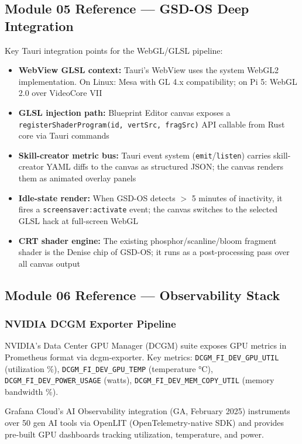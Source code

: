 \documentclass[11pt,letterpaper]{article}
\begin{document}
\subsection{Module 05 Reference --- GSD-OS Deep Integration}

Key Tauri integration points for the WebGL/GLSL pipeline:

\begin{itemize}[noitemsep]
  \item \textbf{WebView GLSL context:} Tauri's WebView uses the system WebGL2 implementation. On Linux: Mesa with GL 4.x compatibility; on Pi 5: WebGL 2.0 over VideoCore VII
  \item \textbf{GLSL injection path:} Blueprint Editor canvas exposes a \texttt{registerShaderProgram(id, vertSrc, fragSrc)} API callable from Rust core via Tauri commands
  \item \textbf{Skill-creator metric bus:} Tauri event system (\texttt{emit}/\texttt{listen}) carries skill-creator YAML diffs to the canvas as structured JSON; the canvas renders them as animated overlay panels
  \item \textbf{Idle-state render:} When GSD-OS detects $>$ 5 minutes of inactivity, it fires a \texttt{screensaver:activate} event; the canvas switches to the selected GLSL hack at full-screen WebGL
  \item \textbf{CRT shader engine:} The existing phosphor/scanline/bloom fragment shader is the Denise chip of GSD-OS; it runs as a post-processing pass over all canvas output
\end{itemize}

\subsection{Module 06 Reference --- Observability Stack}

\subsubsection{NVIDIA DCGM Exporter Pipeline}

NVIDIA's Data Center GPU Manager (DCGM) suite exposes GPU metrics in Prometheus format via dcgm-exporter. Key metrics: \texttt{DCGM\_FI\_DEV\_GPU\_UTIL} (utilization \%), \texttt{DCGM\_FI\_DEV\_GPU\_TEMP} (temperature °C), \texttt{DCGM\_FI\_DEV\_POWER\_USAGE} (watts), \texttt{DCGM\_FI\_DEV\_MEM\_COPY\_UTIL} (memory bandwidth \%).

Grafana Cloud's AI Observability integration (GA, February 2025) instruments over 50 gen AI tools via OpenLIT (OpenTelemetry-native SDK) and provides pre-built GPU dashboards tracking utilization, temperature, and power.
\end{document}
